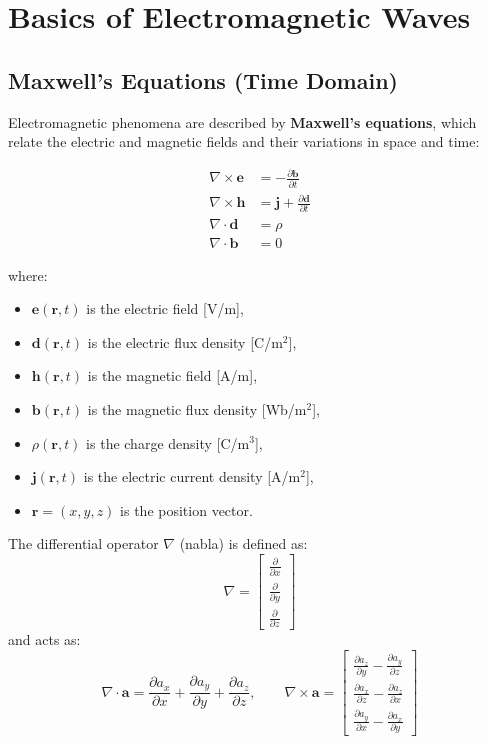 
\chapter{Basics of Electromagnetic Waves}

\section{Maxwell’s Equations (Time Domain)}

Electromagnetic phenomena are described by \textbf{Maxwell’s equations}, which relate the electric and magnetic fields and their variations in space and time:

\begin{align}
\nabla \times \mathbf{e} &= - \frac{\partial \mathbf{b}}{\partial t} \\
\nabla \times \mathbf{h} &= \mathbf{j} + \frac{\partial \mathbf{d}}{\partial t} \\
\nabla \cdot \mathbf{d} &= \rho \\
\nabla \cdot \mathbf{b} &= 0
\end{align}

where:
\begin{itemize}
    \item $\mathbf{e}(\mathbf{r},t)$ is the electric field [V/m],
    \item $\mathbf{d}(\mathbf{r},t)$ is the electric flux density [C/m$^2$],
    \item $\mathbf{h}(\mathbf{r},t)$ is the magnetic field [A/m],
    \item $\mathbf{b}(\mathbf{r},t)$ is the magnetic flux density [Wb/m$^2$],
    \item $\rho(\mathbf{r},t)$ is the charge density [C/m$^3$],
    \item $\mathbf{j}(\mathbf{r},t)$ is the electric current density [A/m$^2$],
    \item $\mathbf{r} = (x, y, z)$ is the position vector.
\end{itemize}

The differential operator $\nabla$ (nabla) is defined as:
\[
\nabla = 
\begin{bmatrix}
\frac{\partial}{\partial x} \\
\frac{\partial}{\partial y} \\
\frac{\partial}{\partial z}
\end{bmatrix}
\]
and acts as:
\[
\nabla \cdot \mathbf{a} = 
\frac{\partial a_x}{\partial x} +
\frac{\partial a_y}{\partial y} +
\frac{\partial a_z}{\partial z},
\qquad
\nabla \times \mathbf{a} = 
\begin{bmatrix}
\frac{\partial a_z}{\partial y} - \frac{\partial a_y}{\partial z} \\
\frac{\partial a_x}{\partial z} - \frac{\partial a_z}{\partial x} \\
\frac{\partial a_y}{\partial x} - \frac{\partial a_x}{\partial y}
\end{bmatrix}
\]


